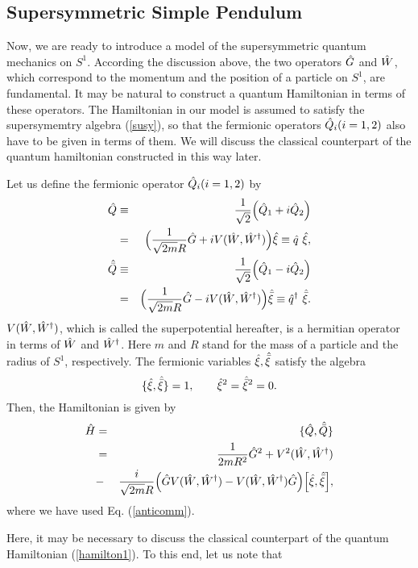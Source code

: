 \documentclass[a4paper,12pt]{article}
\begin{document}
\subsection{Supersymmetric Simple Pendulum}
Now, we are ready to introduce a model of the supersymmetric quantum 
mechanics on $S^1$.
According the discussion above, the two 
operators $\hat G$ and $\hat W$, which correspond to the momentum 
and the position of a particle on
$S^1$, are fundamental. It may be natural to construct a quantum 
Hamiltonian in terms of these operators. The Hamiltonian in our model
is assumed to satisfy the supersymemtry algebra (\ref{susy}), so that 
the fermionic operators ${\hat Q}_i(i=1, 2)$ also have to be given in 
terms of them.
We will discuss the classical counterpart of the quantum hamiltonian 
constructed in this way later.
\par
Let us define the fermionic operator ${\hat Q}_i(i=1,2)$ by
\begin{eqnarray}
\hat Q&\equiv&{1\over{\sqrt 2}}\Bigl({\hat Q}_1+i{\hat Q}_2\Bigr) \nonumber\\
&=&\Bigl({1\over{\sqrt{2m}R}}\hat G +i V(\hat W,{\hat W}^{\dagger})\Bigr)\hat\xi
\equiv {\hat q}~\hat\xi,
\label{supercharge}\\
\hat{\bar Q}&\equiv&{1\over{\sqrt 2}}\Bigl({\hat Q}_1-i{\hat Q}_2\Bigr)
\nonumber\\
&=&\Bigl({1\over{\sqrt{2m}R}}\hat G-iV(\hat W,{\hat W}^{\dagger})\Bigr)\hat{\bar\xi}
\equiv {\hat q}^{\dagger}~\hat{\bar\xi}.
\label{supercharge1}
\end{eqnarray}
$V(\hat W,{\hat W}^{\dagger})$, which is called the superpotential hereafter, is a hermitian 
operator in terms of $\hat W$ and ${\hat W}^{\dagger}$. Here $m$ and $R$ stand for 
the mass of a particle and the radius of $S^1$, respectively.
The fermionic variables $\hat\xi, \hat{\bar\xi}$ satisfy the algebra
\begin{equation}
\{\hat\xi,\hat{\bar\xi}\}=1,\qquad \hat\xi^2=\hat{\bar\xi}^2=0.
\label{anticomm}
\end{equation}
Then, the Hamiltonian is given by
\begin{eqnarray}
\hat H &=& \{{\hat Q},{\hat {\bar Q}}\} \nonumber \\
&=& {1\over{2m R^2}}\hat G^2+V^2(\hat W,{\hat W}^{\dagger})\nonumber\\
&-&{i\over {{\sqrt{2m}R}}}
\Bigl(\hat G V(\hat W,{\hat W}^{\dagger})-V(\hat W,{\hat W}^{\dagger})\hat G\Bigr)\Bigl[\hat\xi, \hat{\bar\xi}\Bigr],
\label{hamilton1}
\end{eqnarray}
where we have used Eq. (\ref{anticomm}).  
\par
Here, it may be necessary to discuss the classical counterpart 
of the quantum Hamiltonian (\ref{hamilton1}). To this end, let us note that
\end{document}
